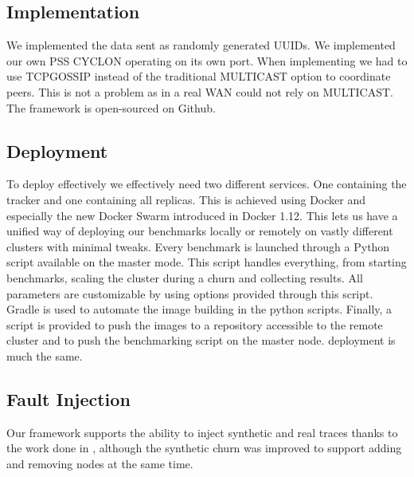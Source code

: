 \subsection{Implementation}
We implemented the data sent as randomly generated UUIDs. We implemented our own PSS CYCLON operating on its own port. When implementing \jgroups we had to use TCPGOSSIP instead of the traditional MULTICAST option to coordinate peers. This is not a problem as in a real WAN \jgroups could not rely on MULTICAST. The framework is open-sourced on Github.
\subsection{Deployment}
To deploy \epto effectively we effectively need two different services. One containing the tracker and one containing all \epto replicas. This is achieved using Docker and especially the new Docker Swarm introduced in Docker 1.12. This lets us have a unified way of deploying our benchmarks locally or remotely on vastly different clusters with minimal tweaks. Every benchmark is launched through a Python script available on the master mode. This script handles everything, from starting benchmarks, scaling the cluster during a churn and collecting results. All \epto parameters are customizable by using options provided through this script.
Gradle is used to automate the image building in the python scripts. Finally, a script is provided to push the images to a repository accessible to the remote cluster and to push the benchmarking script on the master node. \jgroups deployment is much the same. 
\subsection{Fault Injection}
Our framework supports the ability to inject synthetic and real traces thanks to the work done in \autocite{vaucher2016erasure}, although the synthetic churn was improved to support adding and removing nodes at the same time.